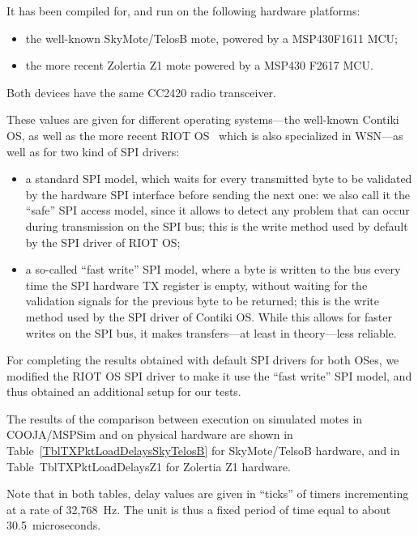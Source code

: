 \documentclass[10pt,final,journal,twocolumn]{IEEEtran}
\begin{document}
It has been compiled for, and run on the following hardware platforms:
\begin{itemize}
\item the well-known SkyMote/TelosB mote, powered by a MSP430F1611 MCU;
\item the more recent Zolertia Z1 mote powered by a MSP430 F2617 MCU.
\end{itemize}
Both devices have the same CC2420 radio transceiver.

These values are given for different operating systems---the well-known
Contiki OS, as well as the more recent RIOT OS~\cite{RIOT} which is also
specialized in WSN---as well as for two kind of SPI drivers:
\begin{itemize}
\item a standard SPI model, which waits for every transmitted byte to be
validated by the hardware SPI interface before sending the next one:
we also call it the ``safe'' SPI access model, since it allows to detect
any problem that can occur during transmission on the SPI bus; this is
the write method used by default by the SPI driver of RIOT OS;
\item a so-called ``fast write'' SPI model, where a byte is written to
the bus every time the SPI hardware TX register is empty, without waiting
for the validation signals for the previous byte to be returned; this is
the write method used by the SPI driver of Contiki OS. While this allows
for faster writes on the SPI bus, it makes transfers---at least in
theory---less reliable.
\end{itemize}

For completing the results obtained with default SPI drivers for both OSes,
we modified the RIOT OS SPI driver to make it use the ``fast write''
SPI model, and thus obtained an additional setup for our tests.

The results of the comparison between execution on simulated motes
in COOJA/MSPSim and on physical hardware are shown in
Table~\ref{TblTXPktLoadDelaysSkyTelosB} for SkyMote/TelsoB hardware,
and in Table~{TblTXPktLoadDelaysZ1} for Zolertia Z1 hardware.

Note that in both tables, delay values are given in ``ticks'' of timers
incrementing at a rate of 32,768~Hz. The unit is thus a fixed period of
time equal to about 30.5~microseconds.


\newcommand{\tabtitle}[1]{\multicolumn{8}{c}{\bfseries #1}}
\newcommand{\ticks}[1]{#1 t.}
\newcommand{\moy}[1]{$\mu=$ \ticks{#1}}
\newcommand{\ect}[1]{$\sigma=$ \ticks{#1}}
\newcommand{\estus}[1]{($\approx$ #1 $\mu$sec.)}
\newcommand{\prctv}[1]{$\approx$ #1\% exp. value}
\end{document}
